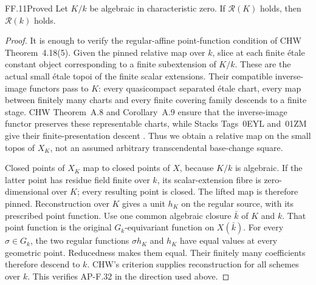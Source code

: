 \begin{claim}{FF.11}{Proved}\label{clm:FFdescent}
Let \(K/k\) be algebraic in characteristic zero. If
\(\mathcal R(K)\) holds, then \(\mathcal R(k)\) holds.
\end{claim}
\begin{proof}
It is enough to verify the regular-affine point-function condition
of CHW Theorem~4.18(5). Given the pinned relative map over \(k\),
slice at each finite \'etale constant object corresponding to a
finite subextension of \(K/k\). These are the actual small \'etale
topoi of the finite scalar extensions. Their compatible inverse-image
functors pass to \(K\): every quasicompact separated \'etale chart,
every map between finitely many charts and every finite covering
family descends to a finite stage. CHW Theorem~A.8 and Corollary~A.9
ensure that the inverse-image functor preserves these representable
charts, while Stacks Tags~0EYL and~01ZM give their finite-presentation
descent \citep{FF_StacksLimits}. Thus we obtain a relative map on
the small topos of \(X_K\), not an assumed arbitrary transcendental
base-change square.

Closed points of \(X_K\) map to closed points of \(X\), because
\(K/k\) is algebraic. If the latter point has residue field
finite over \(k\), its scalar-extension fibre is zero-dimensional
over \(K\); every resulting point is closed. The lifted map
is therefore pinned. Reconstruction over \(K\) gives a unit
\(h_K\) on the regular source, with its prescribed point function.
Use one common algebraic closure \(\bar k\) of \(K\) and \(k\).
That point function is the original \(G_k\)-equivariant function
on \(X(\bar k)\). For every \(\sigma\in G_k\), the two
regular functions \(\sigma h_K\) and \(h_K\) have equal values
at every geometric point. Reducedness makes them equal.
Their finitely many coefficients therefore descend to \(k\).
CHW's criterion supplies reconstruction for all schemes over \(k\).
This verifies AP-F.32 in the direction used above.
\end{proof}

